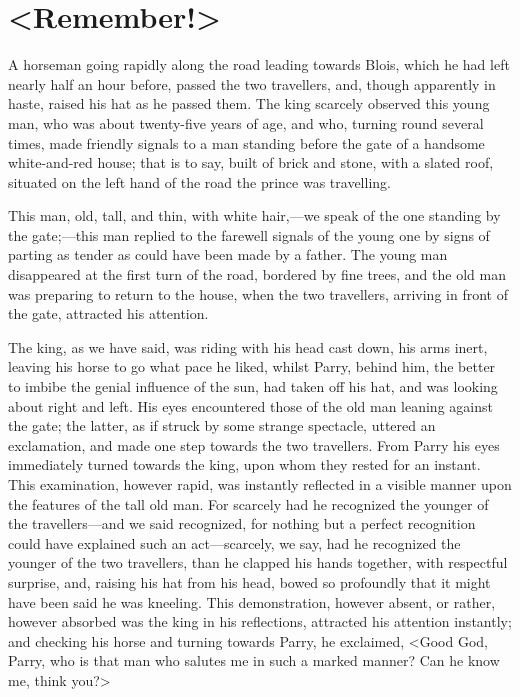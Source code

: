 \chapter{<Remember!>}
	
\lettrine{A}{} horseman going rapidly along the road leading towards Blois, which he had left nearly half an hour before, passed the two travellers, and, though apparently in haste, raised his hat as he passed them. The king scarcely observed this young man, who was about twenty-five years of age, and who, turning round several times, made friendly signals to a man standing before the gate of a handsome white-and-red house; that is to say, built of brick and stone, with a slated roof, situated on the left hand of the road the prince was travelling.

This man, old, tall, and thin, with white hair,—we speak of the one standing by the gate;—this man replied to the farewell signals of the young one by signs of parting as tender as could have been made by a father. The young man disappeared at the first turn of the road, bordered by fine trees, and the old man was preparing to return to the house, when the two travellers, arriving in front of the gate, attracted his attention.

The king, as we have said, was riding with his head cast down, his arms inert, leaving his horse to go what pace he liked, whilst Parry, behind him, the better to imbibe the genial influence of the sun, had taken off his hat, and was looking about right and left. His eyes encountered those of the old man leaning against the gate; the latter, as if struck by some strange spectacle, uttered an exclamation, and made one step towards the two travellers. From Parry his eyes immediately turned towards the king, upon whom they rested for an instant. This examination, however rapid, was instantly reflected in a visible manner upon the features of the tall old man. For scarcely had he recognized the younger of the travellers—and we said recognized, for nothing but a perfect recognition could have explained such an act—scarcely, we say, had he recognized the younger of the two travellers, than he clapped his hands together, with respectful surprise, and, raising his hat from his head, bowed so profoundly that it might have been said he was kneeling. This demonstration, however absent, or rather, however absorbed was the king in his reflections, attracted his attention instantly; and checking his horse and turning towards Parry, he exclaimed, <Good God, Parry, who is that man who salutes me in such a marked manner? Can he know me, think you?>

